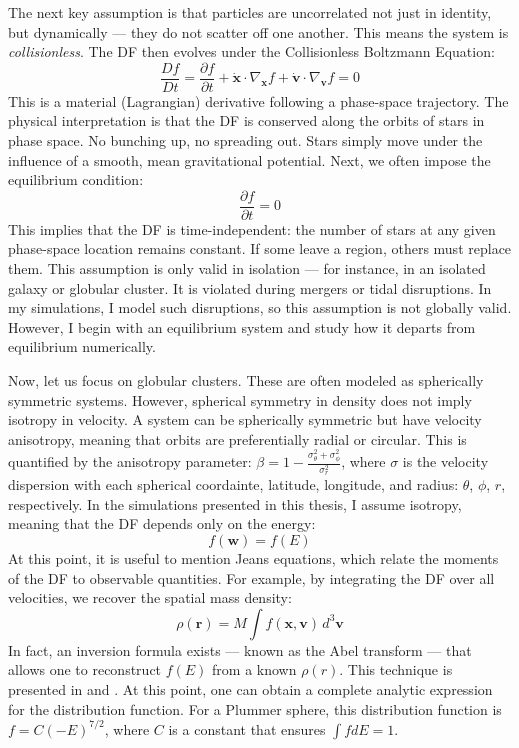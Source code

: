         The next key assumption is that particles are uncorrelated not just in identity, but dynamically — they do not scatter off one another. This means the system is \textit{collisionless}. The DF then evolves under the Collisionless Boltzmann Equation:
        \begin{equation}
        \frac{Df}{Dt} = \frac{\partial f}{\partial t} + \dot{\mathbf{x}} \cdot \nabla_{\mathbf{x}} f + \dot{\mathbf{v}} \cdot \nabla_{\mathbf{v}} f = 0
        \end{equation}
        This is a material (Lagrangian) derivative following a phase-space trajectory. The physical interpretation is that the DF is conserved along the orbits of stars in phase space. No bunching up, no spreading out. Stars simply move under the influence of a smooth, mean gravitational potential. Next, we often impose the equilibrium condition:
        \[
        \frac{\partial f}{\partial t} = 0
        \]
        This implies that the DF is time-independent: the number of stars at any given phase-space location remains constant. If some leave a region, others must replace them. This assumption is only valid in isolation — for instance, in an isolated galaxy or globular cluster. It is violated during mergers or tidal disruptions. In my simulations, I model such disruptions, so this assumption is not globally valid. However, I begin with an equilibrium system and study how it departs from equilibrium numerically.

        Now, let us focus on globular clusters. These are often modeled as spherically symmetric systems. However, spherical symmetry in density does not imply isotropy in velocity. A system can be spherically symmetric but have velocity anisotropy, meaning that orbits are preferentially radial or circular. This is quantified by the anisotropy parameter: \( \beta = 1 - \frac{\sigma^2_\theta + \sigma^2_\phi}{\sigma^2_r} \), where $\sigma$ is the velocity dispersion with each spherical coordainte, latitude, longitude, and radius: $\theta$, $\phi$, $r$, respectively. In the simulations presented in this thesis, I assume isotropy, meaning that the DF depends only on the energy:
        \[
        f(\mathbf{w}) = f(E)
        \]
        At this point, it is useful to mention Jeans equations, which relate the moments of the DF to observable quantities. For example, by integrating the DF over all velocities, we recover the spatial mass density:
        \[
        \rho(\mathbf{r}) = M \int f(\mathbf{x}, \mathbf{v}) \, d^3\mathbf{v}
        \]
        In fact, an inversion formula exists — known as the Abel transform — that allows one to reconstruct \( f(E) \) from a known \( \rho(r) \). This technique is presented in \citet{2008gady.book.....B} and \citet{bovy_inprep}. At this point, one can obtain a complete analytic expression for the distribution function. For a Plummer sphere, this distribution function is $f = C (-E)^{7/2}$, where $C$ is a constant that ensures $\int f dE =1$. 
